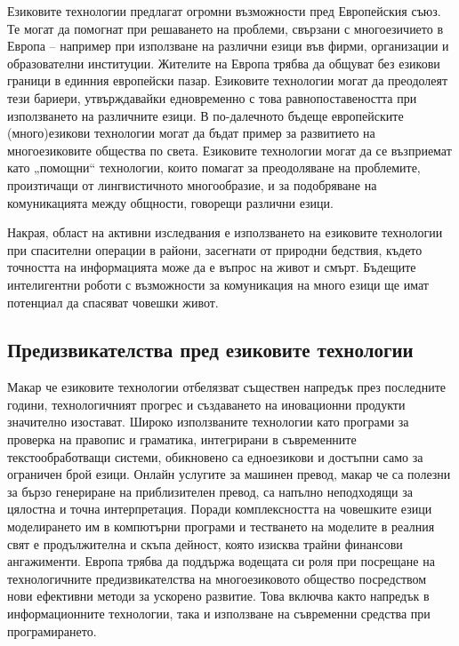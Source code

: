 \begin{multicols}{2}
  Езиковите технологии предлагат огромни възможности пред Европейския
   съюз. Те могат да помогнат при решаването на проблеми, свързани с многоезичието в Европа – например при използване на различни езици във фирми, организации и образователни институции. Жителите на Европа трябва  да общуват без езикови граници в единния европейски пазар.  Езиковите технологии могат да преодолеят тези бариери, утвърждавайки едновременно с това равнопоставеността при използването на различните езици. 
  В по-далечното бъдеще европейските (много)езикови технологии могат да бъдат пример за развитието на многоезиковите общества по света.
   Езиковите технологии могат да се възприемат като „помощни“ технологии, които помагат за преодоляване на проблемите, произтичащи от лингвистичното многообразие, и за подобряване на комуникацията между общности, говорещи различни езици.

  Накрая, област на активни изследвания е използването на езиковите технологии при спасителни операции в райони, засегнати от природни бедствия, където
   точността на информацията може да е въпрос на живот и смърт. Бъдещите интелигентни роботи с възможности за комуникация на много езици ще имат потенциал да спасяват човешки живот.

  \subsection{Предизвикателства пред езиковите технологии}

  Макар че езиковите технологии отбелязват съществен
   напредък през последните години,
   технологичният прогрес и създаването на иновационни продукти значително изостават. Широко използваните технологии като програми за проверка на правопис и граматика, интегрирани в съвременните текстообработващи системи, 
  обикновено са едноезикови и достъпни само за ограничен брой езици. 
  Онлайн услугите за машинен превод, макар че са полезни за бързо генериране на приблизителен превод, са напълно неподходящи за цялостна и точна интерпретация. Поради комплексността на човешките езици моделирането им в компютърни програми и тестването на моделите в реалния свят е продължителна и скъпа дейност, която изисква трайни финансови ангажименти.  
  Европа трябва да поддържа водещата си роля при посрещане на технологичните предизвикателства на многоезиковото общество посредством нови ефективни методи за ускорено развитие. Това включва както напредък в информационните технологии, така и използване на съвременни средства при програмирането.


\end{multicols}
